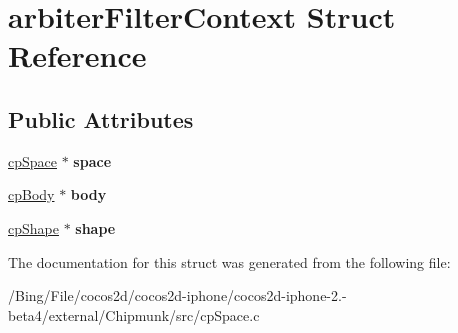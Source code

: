 \hypertarget{structarbiter_filter_context}{\section{arbiter\-Filter\-Context Struct Reference}
\label{structarbiter_filter_context}
}
\subsection*{Public Attributes}
\begin{DoxyCompactItemize}
\item 
\hypertarget{structarbiter_filter_context_ae51b751b5c305fc556e78f9f97a093b7}{\hyperlink{structcp_space}{cp\-Space} $\ast$ {\bfseries space}}\label{structarbiter_filter_context_ae51b751b5c305fc556e78f9f97a093b7}

\item 
\hypertarget{structarbiter_filter_context_a7ccc5219b5dcf89297d3fa5bc590059d}{\hyperlink{structcp_body}{cp\-Body} $\ast$ {\bfseries body}}\label{structarbiter_filter_context_a7ccc5219b5dcf89297d3fa5bc590059d}

\item 
\hypertarget{structarbiter_filter_context_a0796005874b2e589f847fe97451c5b52}{\hyperlink{structcp_shape}{cp\-Shape} $\ast$ {\bfseries shape}}\label{structarbiter_filter_context_a0796005874b2e589f847fe97451c5b52}

\end{DoxyCompactItemize}


The documentation for this struct was generated from the following file\-:\begin{DoxyCompactItemize}
\item 
/\-Bing/\-File/cocos2d/cocos2d-\/iphone/cocos2d-\/iphone-\/2.-\/beta4/external/\-Chipmunk/src/cp\-Space.\-c\end{DoxyCompactItemize}
